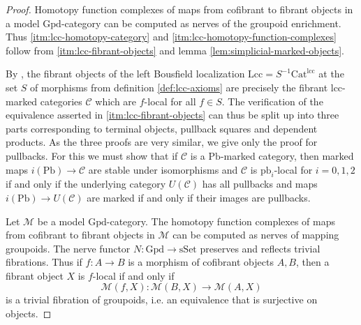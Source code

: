 \documentclass[a4paper]{article}
\theoremstyle{remark}
\theoremstyle{definition}
\begin{document}
\begin{proof}
  Homotopy function complexes of maps from cofibrant to fibrant objects in a model $\mathrm{Gpd}$-category can be computed as nerves of the groupoid enrichment.
  Thus \ref{itm:lcc-homotopy-category} and \ref{itm:lcc-homotopy-function-complexes} follow from \ref{itm:lcc-fibrant-objects} and lemma \ref{lem:simplicial-marked-objects}.

  By \cite[Theorem 4.1.1]{hirschhorn}, the fibrant objects of the left Bousfield localization $\mathrm{Lcc} = S^{-1} \mathrm{Cat}^{\mathrm{lcc}}$ at the set $S$ of morphisms from definition \ref{def:lcc-axioms} are precisely the fibrant lcc-marked categories $\mathcal{C}$ which are $f$-local for all $f \in S$.
  The verification of the equivalence asserted in \ref{itm:lcc-fibrant-objects} can thus be split up into three parts corresponding to terminal objects, pullback squares and dependent products.
  As the three proofs are very similar, we give only the proof for pullbacks.
  For this we must show that if $\mathcal{C}$ is a $\mathrm{Pb}$-marked category, then marked maps $i(\mathrm{Pb}) \rightarrow \mathcal{C}$ are stable under isomorphisms and $\mathcal{C}$ is $\mathrm{pb}_i$-local for $i = 0, 1, 2$ if and only if the underlying category $U(\mathcal{C})$ has all pullbacks and maps $i(\mathrm{Pb}) \rightarrow U(\mathcal{C})$ are marked if and only if their images are pullbacks.

  Let $\mathcal{M}$ be a model $\mathrm{Gpd}$-category.
  The homotopy function complexes of maps from cofibrant to fibrant objects in $\mathcal{M}$ can be computed as nerves of mapping groupoids.
  The nerve functor $N : \mathrm{Gpd} \rightarrow \mathrm{sSet}$ preserves and reflects trivial fibrations.
  Thus if $f : A \rightarrow B$ is a morphism of cofibrant objects $A, B$, then a fibrant object $X$ is $f$-local if and only if
  \begin{equation}
    \label{eq:locality}
    \mathcal{M}(f, X) : \mathcal{M}(B, X) \rightarrow \mathcal{M}(A, X)
  \end{equation}
  is a trivial fibration of groupoids, i.e. an equivalence that is surjective on objects.
  

\end{proof}
\end{document}
